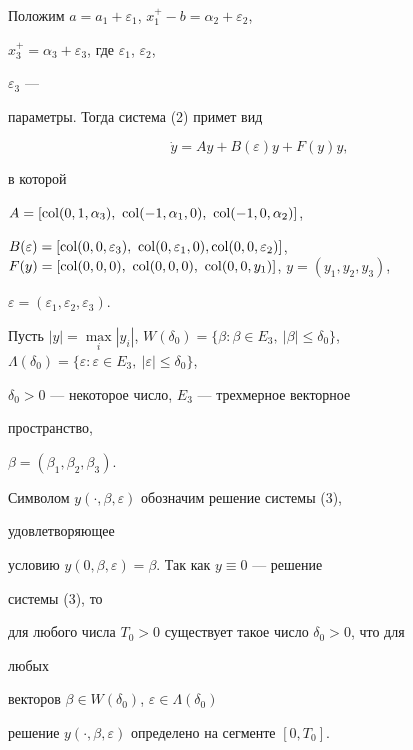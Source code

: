 Положим $a=a_1+\varepsilon_1$, $x^+_1-b=\alpha_2+\varepsilon_2$, 


$x^+_3=\alpha_3+\varepsilon_3$, где $\varepsilon_1$, $\varepsilon_2$, 


$\varepsilon_3$ --- 


параметры. Тогда система (2) примет вид 


\begin{equation} 


\Dot y=Ay+B(\varepsilon)y+F(y)y, 


\end{equation} 


в которой 


$A=[\col(0,1,\alpha_3),\ \col(-1,\alpha_1,0),\ \col(-1,0,\alpha_2)]$, 


$B(\varepsilon)=[\col(0,0,\varepsilon_3),\ \col(0,\varepsilon_1,0),\linebreak


\col(0,0,\varepsilon_2)]$, $F(y)=[\col(0,0,0),\ \col(0,0,0),\ 


\col(0,0,y_1)]$, $y=(y_1,y_2,y_3)$, 


$\varepsilon=(\varepsilon_1,\varepsilon_2,\varepsilon_3)$. 


 


Пусть $|y|=\max\limits_i|y_i|$, $W(\delta_0)=\{\beta:\beta\in E_3,\ 


|\beta|\le\delta_0\}$, $\Lambda(\delta_0)=\{\varepsilon:\varepsilon\in 


E_3,\ |\varepsilon|\le\delta_0\}$, 


$\delta_0>0$ --- некоторое число, $E_3$ --- трехмерное векторное 


пространство, 


$\beta=(\beta_1,\beta_2,\beta_3)$. 


Символом $y(\cdot,\beta,\varepsilon)$ обозначим решение системы (3), 


удовлетворяющее 


условию $y(0,\beta,\varepsilon)=\beta$. Так как $y\equiv 0$ --- решение 


системы (3), то 


для любого числа $T_0>0$ существует такое число $\delta_0>0$, что для 


любых 


векторов $\beta\in W(\delta_0)$, $\varepsilon\in\Lambda(\delta_0)$ 


решение $y(\cdot,\beta,\varepsilon)$ определено на сегменте $[0,T_0]$. 


